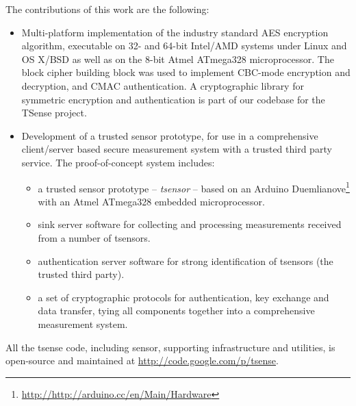 The contributions of this work are the following:
\begin{itemize}
\item Multi-platform implementation of the industry standard AES encryption algorithm, executable on 32- and 64-bit Intel/AMD systems under Linux and OS X/BSD as well as on the 8-bit Atmel ATmega328 microprocessor. The block cipher building block was used to implement CBC-mode encryption and decryption, and CMAC authentication. A cryptographic library for symmetric encryption and authentication is part of our codebase for the TSense project.
\item Development of a trusted sensor prototype, for use in a comprehensive client/server based secure measurement system with a trusted third party service. The proof-of-concept system includes:
\begin{itemize}
\item a trusted sensor prototype -- \textit{tsensor} -- based on an Arduino Duemlianove\footnote{\url{http://http://arduino.cc/en/Main/Hardware}} with an Atmel ATmega328 embedded microprocessor.
\item sink server software for collecting and processing measurements received from a number of tsensors.
\item authentication server software for strong identification of tsensors (the trusted third party).
\item a set of cryptographic protocols for authentication, key exchange and data transfer, tying all components together into a comprehensive measurement system.
\end{itemize}
\end{itemize}

All the tsense code, including sensor, supporting infrastructure and utilities, is open-source and maintained at \url{http://code.google.com/p/tsense}. 




